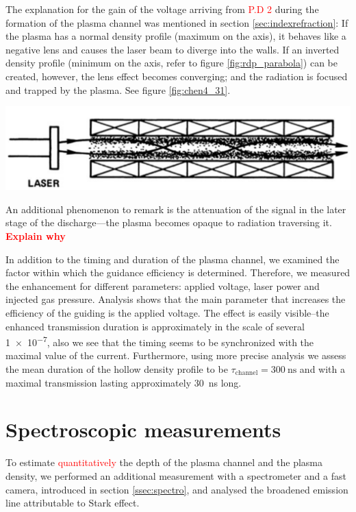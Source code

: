 \documentclass[justified,nofonts,nobib]{tufte-book}
\begin{document}
The explanation for the gain of the voltage arriving from \textcolor{red}{P.D 2} during the formation of the plasma channel was mentioned in section \ref{sec:indexrefraction}: If the plasma has a normal density profile (maximum on the axis), it behaves like a negative lens and causes the laser beam to diverge into the walls. If an inverted density profile (minimum on the axis, refer to figure \ref{fig:rdp_parabola}) can be created, however, the lens effect becomes converging; and the radiation is focused and trapped by the plasma. See figure \ref{fig:chen4_31}.
\begin{marginfigure}
		\includegraphics[width=\marginparwidth]{./figures/chen4_31.PNG}
		\caption{A plasma confined inside the capillary will trap the \SI{800}{\nm} laser light only if the plasma has a density minimum on axis.}
		\label{fig:chen4_31}
\end{marginfigure}

An additional phenomenon to remark is the attenuation of the signal in the later stage of the discharge---the plasma becomes opaque to radiation traversing it. \textcolor{red}{\textbf{Explain why}}

In addition to the timing and duration of the plasma channel, we examined the factor within which the guidance efficiency is determined. Therefore, we measured the enhancement for different parameters: applied voltage, laser power and injected gas pressure. Analysis shows that the main parameter that increases the efficiency of the guiding is the applied voltage. The effect is easily visible--the enhanced transmission duration is approximately in the scale of several \SI{1e-7}{\sec}, also we see that the timing seems to be synchronized with the maximal value of the current. Furthermore, using more precise analysis we assess the mean duration of the hollow density profile to be $\tau_\text{channel}=\SI{300}{\ns}$ and with a maximal transmission lasting approximately \SI{30}{\ns} long.

\section{Spectroscopic measurements}\label{sec:spectro}
To estimate \textcolor{red}{quantitatively} the depth of the plasma channel and the plasma density, we performed an additional measurement with a spectrometer and a fast camera, introduced in section \ref{ssec:spectro}, and analysed the broadened emission line attributable to Stark effect.
\end{document}
